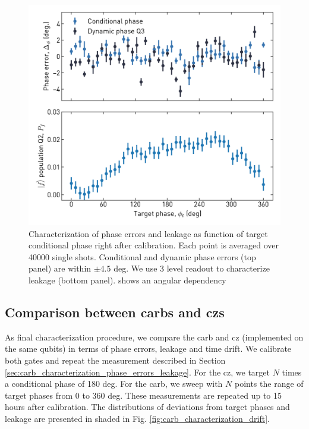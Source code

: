 \begin{figure}[ht]
    \centering
    \includegraphics[width=\textwidth]{chapters/carb_gate/figs/ch4_characterization_phase_error_and_leakage_20200126_094856.png}
    \caption{Characterization of phase errors and leakage as function of target conditional phase right after calibration. Each point is averaged over 40000 single shots. Conditional and dynamic phase errors (top panel) are within $\pm 4.5$ deg. We use 3 level readout to characterize leakage (bottom panel). shows an angular dependency}
    \label{fig:carb_characterization_phase_errors_leakage}
\end{figure}

\subsection{Comparison between \glspl{carb} and \glspl{cz}}
As final characterization procedure, we compare the \gls{carb} and \gls{cz} (implemented on the same qubits) in terms of phase errors, leakage and time drift. We calibrate both gates and repeat the measurement described in Section \ref{sec:carb_characterization_phase_errors_leakage}. For the \gls{cz}, we target $N$ times a conditional phase of 180 deg.  For the \gls{carb}, we sweep with $N$ points the range of target phases from 0 to 360 deg. These measurements are repeated up to 15 hours after calibration. The distributions of deviations from target phases and leakage are presented in shaded in Fig. \ref{fig:carb_characterization_drift}.

